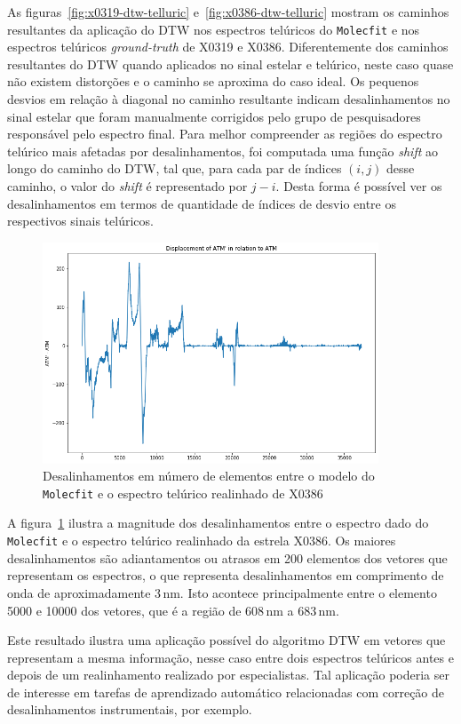 As figuras~\ref{fig:x0319-dtw-telluric} e~\ref{fig:x0386-dtw-telluric} mostram os caminhos resultantes da aplicação do DTW nos espectros telúricos do \texttt{Molecfit} e nos espectros telúricos \textit{ground-truth} de X0319 e X0386. Diferentemente dos caminhos resultantes do DTW quando aplicados no sinal estelar e telúrico, neste caso quase não existem distorções e o caminho se aproxima do caso ideal. Os pequenos desvios em relação à diagonal no caminho resultante indicam desalinhamentos no sinal estelar que foram manualmente corrigidos pelo grupo de pesquisadores responsável pelo espectro final. 
Para melhor compreender as regiões do espectro telúrico mais afetadas por desalinhamentos, foi computada uma função \textit{shift} ao longo do caminho do DTW, tal que, para cada par de índices $(i,j)$ desse caminho, o valor do \textit{shift} é representado por $j - i$. Desta forma é possível ver os desalinhamentos em termos de quantidade de índices de desvio entre os respectivos sinais telúricos.

\begin{figure}[htb]
\centering
\includegraphics[width=10cm]{figuras/x0386_displacement.png}
\caption{Desalinhamentos em número de elementos entre o modelo do \texttt{Molecfit} e o espectro telúrico realinhado de X0386}
\label{fig:x0386-displacement}
\end{figure}

A figura~\ref{fig:x0386-displacement} ilustra a magnitude dos desalinhamentos entre o espectro dado do \texttt{Molecfit} e o espectro telúrico realinhado da estrela X0386. Os maiores desalinhamentos são adiantamentos ou atrasos em 200 elementos dos vetores que representam os espectros, o que representa desalinhamentos em comprimento de onda de aproximadamente 3\,nm. Isto acontece principalmente entre o elemento 5000 e 10000 dos vetores, que é a região de 608\,nm a 683\,nm.

Este resultado ilustra uma aplicação possível do algoritmo DTW em vetores que representam a mesma informação, nesse caso entre dois espectros telúricos antes e depois de um realinhamento realizado por especialistas. Tal aplicação poderia ser de interesse em tarefas de aprendizado automático relacionadas com correção de desalinhamentos instrumentais, por exemplo.

